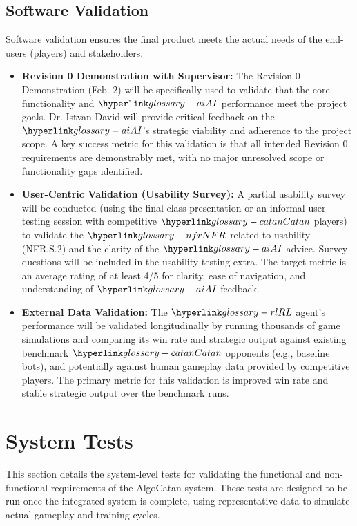 \documentclass[12pt, titlepage]{article}
\begin{document}
\subsection{Software Validation}

Software validation ensures the final product meets the actual needs of the end-users (players) and stakeholders.

\begin{itemize}
    \item \textbf{Revision 0 Demonstration with Supervisor:} The Revision 0 Demonstration (Feb. 2) will be specifically used to validate that the core functionality and $\AI{}$ performance meet the project goals. Dr. Istvan David will provide critical feedback on the $\AI{}$'s strategic viability and adherence to the project scope. A key success metric for this validation is that all intended Revision 0 requirements are demonstrably met, with no major unresolved scope or functionality gaps identified.
    \item \textbf{User-Centric Validation (Usability Survey):} A partial usability survey will be conducted (using the final class presentation or an informal user testing session with competitive $\Catan{}$ players) to validate the $\NFR{}$ related to usability (NFR.S.2) and the clarity of the $\AI{}$ advice. Survey questions will be included in the usability testing extra. The target metric is an average rating of at least 4/5 for clarity, ease of navigation, and understanding of $\AI{}$ feedback.
    \item \textbf{External Data Validation:} The $\RL{}$ agent's performance will be validated longitudinally by running thousands of game simulations and comparing its win rate and strategic output against existing benchmark $\Catan{}$ opponents (e.g., baseline bots), and potentially against human gameplay data provided by competitive players. The primary metric for this validation is improved win rate and stable strategic output over the benchmark runs.
\end{itemize}


\section{System Tests}

This section details the system-level tests for validating the functional and non-functional requirements of the AlgoCatan system. These tests are designed to be run once the integrated system is complete, using representative data to simulate actual gameplay and training cycles.
\end{document}
